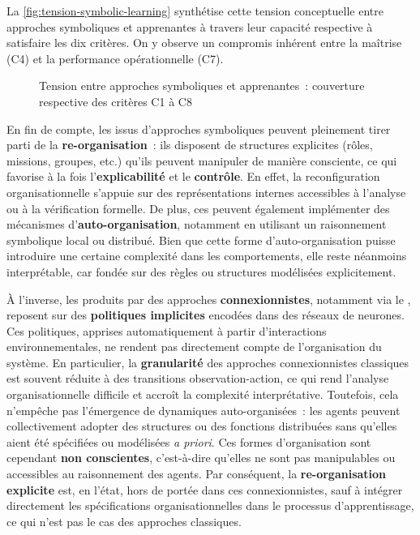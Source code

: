 La \autoref{fig:tension-symbolic-learning} synthétise cette tension conceptuelle entre approches symboliques et apprenantes à travers leur capacité respective à satisfaire les dix critères. On y observe un compromis inhérent entre la maîtrise (C4) et la performance opérationnelle (C7).

\begin{figure}[H]
  \centering
  \resizebox{\textwidth}{!}{%
    
  }
  \caption{Tension entre approches symboliques et apprenantes~: couverture respective des critères C1 à C8}
  \label{fig:tension-symbolic-learning}
\end{figure}

En fin de compte, les  issus d'approches symboliques peuvent pleinement tirer parti de la \textbf{re-organisation}~: ils disposent de structures explicites (rôles, missions, groupes, etc.) qu'ils peuvent manipuler de manière consciente, ce qui favorise à la fois l'\textbf{explicabilité} et le \textbf{contrôle}. En effet, la reconfiguration organisationnelle s'appuie sur des représentations internes accessibles à l'analyse ou à la vérification formelle. De plus, ces  peuvent également implémenter des mécanismes d'\textbf{auto-organisation}, notamment en utilisant un raisonnement symbolique local ou distribué. Bien que cette forme d'auto-organisation puisse introduire une certaine complexité dans les comportements, elle reste néanmoins interprétable, car fondée sur des règles ou structures modélisées explicitement.

À l'inverse, les  produits par des approches \textbf{connexionnistes}, notamment via le , reposent sur des \textbf{politiques implicites} encodées dans des réseaux de neurones. Ces politiques, apprises automatiquement à partir d'interactions environnementales, ne rendent pas directement compte de l'organisation du système. En particulier, la \textbf{granularité} des approches connexionnistes classiques est souvent réduite à des transitions observation-action, ce qui rend l'analyse organisationnelle difficile et accroît la complexité interprétative. Toutefois, cela n'empêche pas l'émergence de dynamiques auto-organisées~: les agents peuvent collectivement adopter des structures ou des fonctions distribuées sans qu'elles aient été spécifiées ou modélisées \textit{a priori}. Ces formes d'organisation sont cependant \textbf{non conscientes}, c'est-à-dire qu'elles ne sont pas manipulables ou accessibles au raisonnement des agents. Par conséquent, la \textbf{re-organisation explicite} est, en l'état, hors de portée dans ces  connexionnistes, sauf à intégrer directement les spécifications organisationnelles dans le processus d'apprentissage, ce qui n'est pas le cas des approches  classiques.

